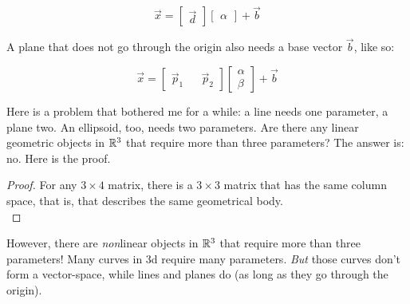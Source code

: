 $$\vec{x} = \begin{bmatrix} \vec{d} \end{bmatrix} \begin{bmatrix} \alpha \end{bmatrix} + \vec{b}$$ 

A plane that does not go through the origin also needs a base vector $\vec{b}$, like so: 

$$\vec{x} = \begin{bmatrix} \vec{p}_1 && \vec{p}_2 \end{bmatrix} \begin{bmatrix} \alpha  \\ \beta \end{bmatrix} + \vec{b}  $$



Here is a problem that bothered me for a while: a line needs one parameter, a plane two. An ellipsoid, too, needs two parameters. Are there any linear geometric objects in $\mathbb{R}^3$ that require more than three parameters? The answer is: no. Here is the proof. 

\begin{proof}
    For any $3 \times 4$ matrix, there is a $3 \times 3$ matrix that has the same column space, that is, that describes the same geometrical body. \\
    
\end{proof}

However, there are \emph{non}linear objects in $\mathbb{R}^3$ that require more than three parameters! Many curves in 3d require many parameters. \emph{But} those curves don't form a vector-space, while lines and planes do (as long as they go through the origin). 


